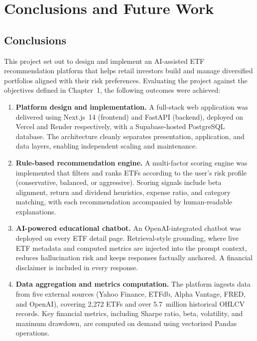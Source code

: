 \chapter{Conclusions and Future Work}

\section{Conclusions}

This project set out to design and implement an AI-assisted ETF recommendation platform that helps retail investors build and manage diversified portfolios aligned with their risk preferences. Evaluating the project against the objectives defined in Chapter~1, the following outcomes were achieved:

\begin{enumerate}
    \item \textbf{Platform design and implementation.} A full-stack web application was delivered using Next.js~14 (frontend) and FastAPI (backend), deployed on Vercel and Render respectively, with a Supabase-hosted PostgreSQL database. The architecture cleanly separates presentation, application, and data layers, enabling independent scaling and maintenance.

    \item \textbf{Rule-based recommendation engine.} A multi-factor scoring engine was implemented that filters and ranks ETFs according to the user's risk profile (conservative, balanced, or aggressive). Scoring signals include beta alignment, return and dividend heuristics, expense ratio, and category matching, with each recommendation accompanied by human-readable explanations.

    \item \textbf{AI-powered educational chatbot.} An OpenAI-integrated chatbot was deployed on every ETF detail page. Retrieval-style grounding, where live ETF metadata and computed metrics are injected into the prompt context, reduces hallucination risk and keeps responses factually anchored. A financial disclaimer is included in every response.

    \item \textbf{Data aggregation and metrics computation.} The platform ingests data from five external sources (Yahoo Finance, ETFdb, Alpha Vantage, FRED, and OpenAI), covering 2,272 ETFs and over 5.7~million historical OHLCV records. Key financial metrics, including Sharpe ratio, beta, volatility, and maximum drawdown, are computed on demand using vectorized Pandas operations.


\end{enumerate}
